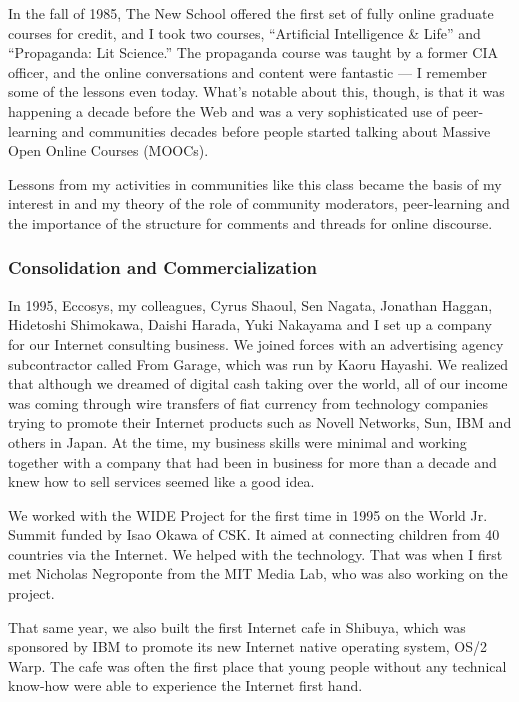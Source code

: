 In the fall of 1985, The New School offered the first set of fully online graduate courses for credit, and I took two courses, ``Artificial Intelligence \& Life'' and ``Propaganda: Lit Science.'' The propaganda course was taught by a former CIA officer, and the online conversations and content were fantastic --- I remember some of the lessons even today. What's notable about this, though, is that it was happening a decade before the Web and was a very sophisticated use of peer-learning and communities decades before people started talking about Massive Open Online Courses (MOOCs).

Lessons from my activities in communities like this class became the basis of my interest in and my theory of the role of community moderators, peer-learning and the importance of the structure for comments and threads for online discourse.

\subsubsection{Consolidation and Commercialization}

In 1995, Eccosys, my colleagues, Cyrus Shaoul, Sen Nagata, Jonathan Haggan, Hidetoshi Shimokawa, Daishi Harada, Yuki Nakayama and I set up a company for our Internet consulting business. We joined forces with an advertising agency subcontractor called From Garage, which was run by Kaoru Hayashi. We realized that although we dreamed of digital cash taking over the world, all of our income was coming through wire transfers of fiat currency from technology companies trying to promote their Internet products such as Novell Networks, Sun, IBM and others in Japan. At the time, my business skills were minimal and working together with a company that had been in business for more than a decade and knew how to sell services seemed like a good idea.

We worked with the \ac{WIDE} Project for the first time in 1995 on the World Jr. Summit funded by Isao Okawa of CSK. It aimed at connecting children from 40 countries via the Internet. We helped with the technology. That was when I first met Nicholas Negroponte from the MIT Media Lab, who was also working on the project.

That same year, we also built the first Internet cafe in Shibuya, which was sponsored by IBM to promote its new Internet native operating system, OS/2 Warp. The cafe was often the first place that young people without any technical know-how were able to experience the Internet first hand.

